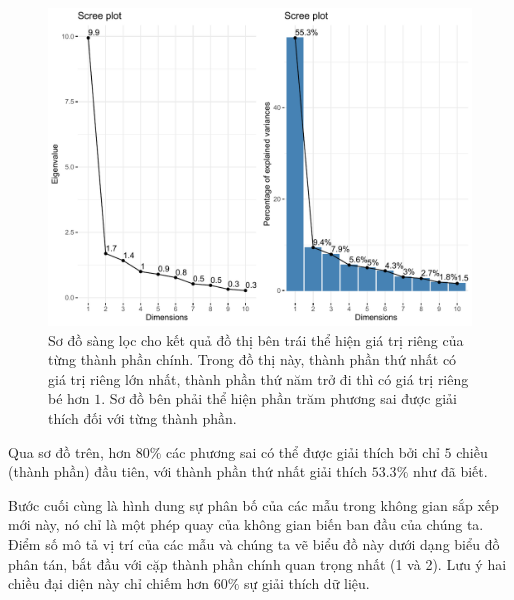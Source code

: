 \documentclass[../thesis.tex]{subfiles}
\begin{document}
\begin{figure}[H]
	\centering
	\includegraphics[width=1\linewidth]{images/Scree_plot_2}
	\caption[Sơ đồ sàng lọc dữ liệu ca nhiễm hằng ngày và giá trị riêng tương ứng]{Sơ đồ sàng lọc cho kết quả đồ thị bên trái thể hiện giá trị riêng của từng thành phần chính. Trong đồ thị này, thành phần thứ nhất có giá trị riêng lớn nhất, thành phần thứ năm trở đi thì có giá trị riêng bé hơn $ 1 $. Sơ đồ bên phải thể hiện phần trăm phương sai được giải thích đối với từng thành phần. }
	\label{fig:screeplot2}
\end{figure}

Qua sơ đồ trên, hơn $ 80\% $ các phương sai có thể được giải thích bởi chỉ $ 5 $ chiều (thành phần) đầu tiên, với thành phần thứ nhất giải thích $ 53.3\% $ như đã biết.

\newpage
Bước cuối cùng là hình dung sự phân bố của các mẫu trong không gian sắp xếp mới này, nó chỉ là một phép quay của không gian biến ban đầu của chúng ta. Điểm số mô tả vị trí của các mẫu và chúng ta vẽ biểu đồ này dưới dạng biểu đồ phân tán, bắt đầu với cặp thành phần chính quan trọng nhất (1 và 2). Lưu ý hai chiều đại diện này chỉ chiếm hơn $ 60\% $ sự giải thích dữ liệu.

\begin{Shaded}
	\begin{Highlighting}[]
\SpecialCharTok{\%\textgreater{}\%}\SpecialCharTok{::}
		 \NormalTok{,}
		 \NormalTok{,}
		 \NormalTok{)}
	\end{Highlighting}
\end{Shaded}
\end{document}
